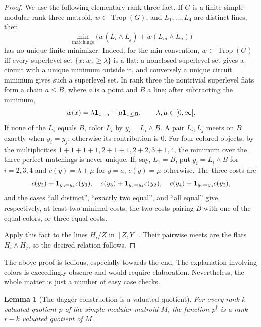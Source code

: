 \documentclass[12pt]{article}
\newtheorem{lemma}[theorem]{Lemma}
\theoremstyle{definition}
\newcommand{\Trop}{\operatorname{Trop}}
\newcommand{\review}[1]{\begin{reviewbox}#1\end{reviewbox}}
\begin{document}
\begin{proof}
We use the following elementary rank-three fact.  If \(G\) is a finite simple modular rank-three matroid, \(w\in\Trop(G)\), and \(L_1,\ldots,L_4\) are distinct lines, then
\[
\min_{\text{matchings}}
\bigl(w(L_i\wedge L_j)+w(L_m\wedge L_n)\bigr)
\]
has no unique finite minimizer.  Indeed, for the min convention, \(w\in\Trop(G)\) iff every superlevel set \(\{x:w_x\ge\lambda\}\) is a flat: a nonclosed superlevel set gives a circuit with a unique minimum outside it, and conversely a unique circuit minimum gives such a superlevel set.  In rank three the nontrivial superlevel flats form a chain \(a\le B\), where \(a\) is a point and \(B\) a line; after subtracting the minimum,
\[
w(x)=\lambda{\bf 1}_{x=a}+\mu{\bf 1}_{x\le B},\qquad \lambda,\mu\in[0,\infty].
\]
If none of the \(L_i\) equals \(B\), color \(L_i\) by \(y_i=L_i\wedge B\).  A pair \(L_i,L_j\) meets on \(B\) exactly when \(y_i=y_j\); otherwise its contribution is \(0\).  For four colored objects, by the multiplicities \(1+1+1+1,2+1+1,2+2,3+1,4\), the minimum over the three perfect matchings is never unique.  If, say, \(L_1=B\), put \(y_i=L_i\wedge B\) for \(i=2,3,4\) and \(c(y)=\lambda+\mu\) for \(y=a\), \(c(y)=\mu\) otherwise.  The three costs are
\[
c(y_2)+{\bf 1}_{y_3=y_4}c(y_3),\quad
c(y_3)+{\bf 1}_{y_2=y_4}c(y_2),\quad
c(y_4)+{\bf 1}_{y_2=y_3}c(y_2),
\]
and the cases ``all distinct'', ``exactly two equal'', and ``all equal'' give, respectively, at least two minimal costs, the two costs pairing \(B\) with one of the equal colors, or three equal costs.

Apply this fact to the lines \(H_i/Z\) in \([Z,Y]\).  Their pairwise meets are the flats \(H_i\wedge H_j\), so the desired relation follows.
\end{proof}
\review{The above proof is tedious, especially towards the end. The explanation involving colors is exceedingly obscure and would require elaboration. Nevertheless, the whole matter is just a number of easy case checks.}

\begin{lemma}[The dagger construction is a valuated quotient]\label{lem:daggerquotient}
For every rank \(k\) valuated quotient \(p\) of the simple modular matroid \(M\), the function \(p^\dagger\) is a rank \(r-k\) valuated quotient of \(M\).
\end{lemma}
\end{document}
